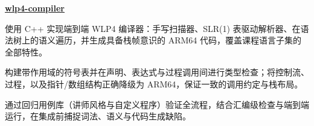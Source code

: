 \begin{twocolentry}{}
\href{https://github.com/faketut/wlp4-compiler}{\textbf{wlp4-compiler}}
\end{twocolentry}
\begin{onecolentry}
\begin{highlights}
\item 使用 C++ 实现端到端 WLP4 编译器：手写扫描器、SLR(1) 表驱动解析器、在语法树上的语义遍历，并生成具备栈帧意识的 ARM64 代码，覆盖课程语言子集的全部特性。
\item 构建带作用域的符号表并在声明、表达式与过程调用间进行类型检查；将控制流、过程，以及指针/数组结构正确降级为 ARM64，保证一致的调用约定与栈布局。
\item 通过回归用例库（讲师风格与自定义程序）验证全流程，结合汇编级检查与端到端运行，在集成前捕捉词法、语义与代码生成缺陷。
\end{highlights}
\end{onecolentry}


